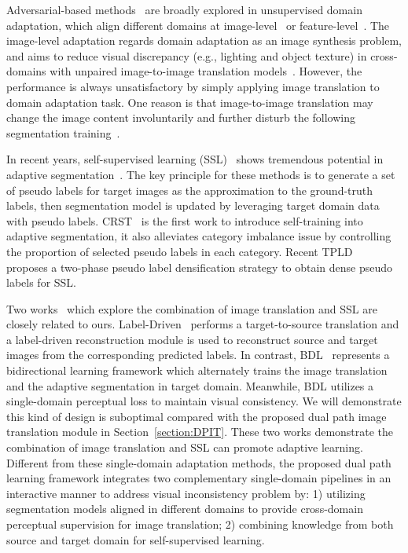 \documentclass[10pt,twocolumn,letterpaper]{article}
\begin{document}
Adversarial-based methods~\cite{hoffman2016fcns, long2018transferable,tsai2018learning} are broadly explored in unsupervised domain adaptation, which align different domains at image-level~\cite{murez2018image,hoffman2018cycada,wu2018dcan} or feature-level~\cite{tsai2018learning,huang2020contextual}. The image-level adaptation regards domain adaptation as an image synthesis problem, and aims to reduce visual discrepancy (e.g., lighting and object texture) in cross-domains with unpaired image-to-image translation models~\cite{CycleGAN2017,liu2017unsupervised,park2020contrastive}. However, the performance is always unsatisfactory by simply applying image translation to domain adaptation task. One reason is that image-to-image translation may change the image content involuntarily and further disturb the following segmentation training~\cite{li2019bidirectional}.

In recent years, self-supervised learning (SSL)~\cite{grandvalet2005semi,zhu2007semi} shows tremendous potential in adaptive segmentation~\cite{zou2018unsupervised,zou2019confidence,subhani2020learning,Two-phase}. The key principle for these methods is to generate a set of pseudo labels for target images as the approximation to the ground-truth labels, then segmentation model is updated by leveraging target domain data with pseudo labels. CRST~\cite{zou2018unsupervised} is the first work to introduce self-training into adaptive segmentation, it also alleviates category imbalance issue by controlling the proportion of selected pseudo labels in each category. Recent TPLD~\cite{Two-phase} proposes a two-phase pseudo label densification strategy to obtain dense pseudo labels for SSL. 

Two works~\cite{li2019bidirectional, yang2020label} which explore the combination of image translation and SSL are closely related to ours. Label-Driven~\cite{yang2020label} performs a target-to-source translation and a label-driven reconstruction module is used to reconstruct source and target images from the corresponding predicted labels. In contrast, BDL~\cite{li2019bidirectional} represents a bidirectional learning framework which alternately trains the image translation and the adaptive segmentation in target domain. Meanwhile, BDL utilizes a single-domain perceptual loss to maintain visual consistency. We will demonstrate this kind of design is suboptimal compared with the proposed dual path image translation module in Section~\ref{section:DPIT}. These two works demonstrate the combination of image translation and SSL can promote adaptive learning. Different from these single-domain adaptation methods, the proposed dual path learning framework integrates two complementary single-domain pipelines in an interactive manner to address visual inconsistency problem by: 1) utilizing segmentation models aligned in different domains to provide cross-domain perceptual supervision for image translation; 2) combining knowledge from both source and target domain for self-supervised learning.
\end{document}

